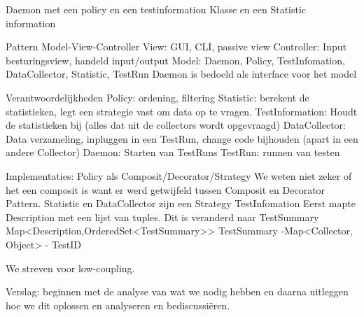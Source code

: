 \documentclass[i1]{oss}
\begin{document}
Daemon met een policy en een testinformation Klasse en een Statistic information 

Pattern Model-View-Controller
View:  GUI, CLI, passive view
Controller:
Input besturingsview, handeld input/output
Model: Daemon, Policy, TestInfomation, DataCollector, Statistic, TestRun
Daemon is bedoeld als interface voor het model

Verantwoordelijkheden
Policy: ordening, filtering
Statistic: berekent de statistieken, legt een strategie vast om data op te vragen.
TestInformation:  Houdt de statistieken bij (alles dat uit de collectors wordt opgevraagd)
DataCollector: Data verzameling, inpluggen in een TestRun, change code bijhouden (apart in een andere Collector)
Daemon:  Starten van TestRuns
TestRun:  runnen van testen

Implementaties:
Policy als Composit/Decorator/Strategy
We weten niet zeker of het een composit is want er werd getwijfeld tussen Composit en Decorator Pattern. 
Statistic en DataCollector zijn een Strategy
TestInfomation
Eerst mapte Description met een lijst van tuples. Dit is veranderd naar TestSummary
Map<Description,OrderedSet<TestSummary>>
	TestSummary	-Map<Collector, Object>
			- TestID


We streven voor low-coupling. 

Verslag: beginnen met de analyse van wat we nodig hebben en daarna uitleggen hoe we dit oplossen en analyseren en bediscussiëren.

 
\end{document}
